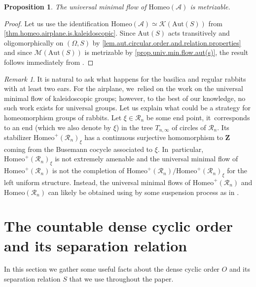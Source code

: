 \documentclass[JEP,XML,SOM,Unicode,NoFloatCountersInSection,published]{cedram}
\theoremstyle{plain}
\newtheorem{proposition}[theorem]{Proposition}
\theoremstyle{definition}
\theoremstyle{remark}
\newtheorem{remark}[theorem]{Remark}
\newcommand{\Aut}{\mathrm{Aut}}
\newcommand{\Homeo}{\mathrm{Homeo}}
\newcommand{\A}{\mathcal{A}}
\newcommand{\R}{\mathcal{R}}
\newcommand{\K}{\mathcal{K}}
\begin{document}
\begin{proposition}
\label{prop.UMF.homeo.airplane.is.metrizable}
The universal minimal flow of $\Homeo(\A)$ is metrizable.
\end{proposition}

\begin{proof}
Let us use the identification $\Homeo(\A)\simeq\K(\Aut(S))$ from \cref{thm.homeo.airplane.is.kaleidoscopic}.
Since $\Aut(S)$ acts transitively and oligomorphically on $(\Omega,S)$ by \cref{lem.aut.circular.order.and.relation.properties} and since $\mathcal{M}(\Aut(S))$ is metrizable by \cref{prop.univ.min.flow.aut(s)}, the result follows immediately from \cite[Th.\,1.1]{Kaleidoscopic2}.
\end{proof}

\begin{remark}
It is natural to ask what happens for the basilica and regular rabbits with at least two ears.
For the airplane, we~relied on the work \cite{Kaleidoscopic2} on the universal minimal flow of kaleidoscopic groups;
however, to the best of our knowledge, no such work exists for universal groups.
Let us explain what could be a strategy for homeomorphism groups of rabbits.
Let $\xi\in\R_n$ be some end point, it~corresponds to an end (which we also denote by $\xi$) in the tree $T_{n,\infty}$ of circles of $\R_n$.
Its stabilizer $\Homeo^+(\R_n)_\xi$ has a continuous surjective homomorphism to $\mathbf{Z}$ coming from the Busemann cocycle associated to $\xi$. In~particular, $\Homeo^+(\R_n)_\xi$ is not extremely amenable and the universal minimal flow of $\Homeo^+(\R_n)$ is not the completion of $\Homeo^+(\R_n)/\Homeo^+(\R_n)_\xi$ for the left uniform structure.
Instead, the universal minimal flows of $\Homeo^+(\R_n)$ and $\Homeo(\R_n)$ can likely be obtained using by some suspension process as in \cite[\S7]{Duchesne-2023}.
\end{remark}

\appendix
\section{The countable dense cyclic order and its separation relation}
\label{sec.order.and.separation}

In this section we gather some useful facts about the dense cyclic order $O$ and its separation relation $S$ that we use throughout the paper.

\end{document}
